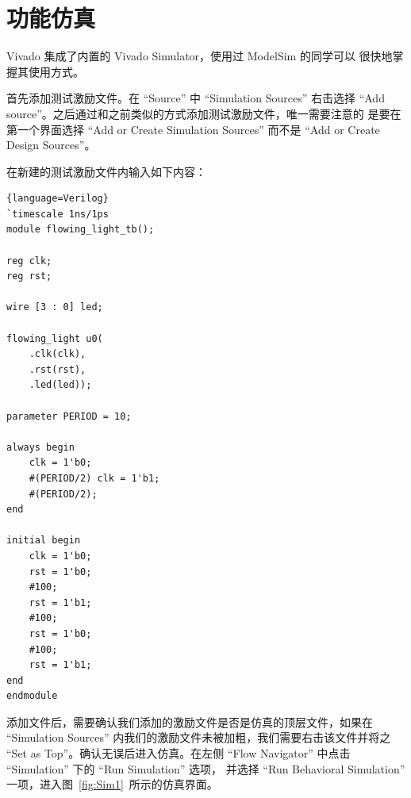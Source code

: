 \documentclass[ichigo,normal,cn]{elegantnote_mod}
\begin{document}
\begin{center}
\end{center}

\section{功能仿真}

Vivado 集成了内置的 Vivado Simulator，使用过 ModelSim 的同学可以
很快地掌握其使用方式。

首先添加测试激励文件。在 “Source” 中 “Simulation Sources” 右击选择
 “Add source”。之后通过和之前类似的方式添加测试激励文件，唯一需要注意的
 是要在第一个界面选择 “Add or Create Simulation Sources” 而不是
 “Add or Create Design Sources”。

在新建的测试激励文件内输入如下内容：

\begin{lstlisting}{language=Verilog}
`timescale 1ns/1ps
module flowing_light_tb(); 
 
reg clk; 
reg rst;

wire [3 : 0] led; 
 
flowing_light u0(
    .clk(clk),
    .rst(rst),
    .led(led)); 

parameter PERIOD = 10; 

always begin
    clk = 1'b0;
    #(PERIOD/2) clk = 1'b1;
    #(PERIOD/2);
end 
 
initial begin
    clk = 1'b0;
    rst = 1'b0;
    #100;
    rst = 1'b1;
    #100;
    rst = 1'b0;
    #100;
    rst = 1'b1;
end 
endmodule 
\end{lstlisting}

添加文件后，需要确认我们添加的激励文件是否是仿真的顶层文件，如果在 “Simulation Sources”
内我们的激励文件未被加粗，我们需要右击该文件并将之 “Set as Top”。确认无误后进入仿真。在左侧 
“Flow Navigator” 中点击 “Simulation” 下的 “Run Simulation” 选项，
并选择 “Run Behavioral Simulation” 一项，进入图~\ref{fig:Sim1}~所示的仿真界面。 
\end{document}
